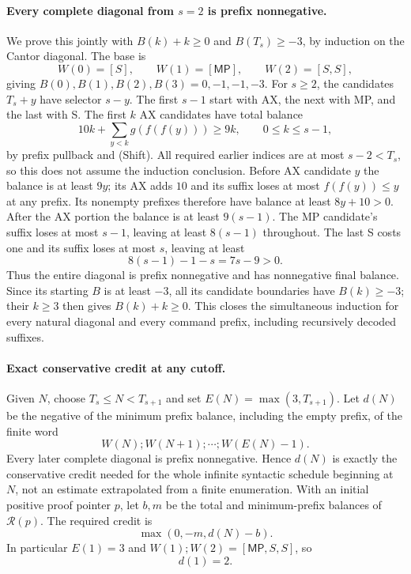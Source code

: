 \paragraph{Every complete diagonal from $s=2$ is prefix nonnegative.}
We prove this jointly with $B(k)+k\ge0$ and $B(T_s)\ge-3$, by induction
on the Cantor diagonal.  The base is
\[
 W(0)=[S],\qquad W(1)=[\mathsf{MP}],\qquad W(2)=[S,S],
\]
giving $B(0),B(1),B(2),B(3)=0,-1,-1,-3$.
For $s\ge2$, the candidates $T_s+y$ have selector $s-y$.
The first $s-1$ start with AX, the next with MP, and the last with S.
The first $k$ AX candidates have total balance
\[
 10k+\sum_{y<k}g(f(f(y)))\ge9k,\qquad 0\le k\le s-1,
\]
by prefix pullback and (Shift).  All required earlier indices are at
most $s-2<T_s$, so this does not assume the induction conclusion.
Before AX candidate $y$ the balance is at least $9y$; its AX adds $10$
and its suffix loses at most $f(f(y))\le y$ at any prefix.  Its
nonempty prefixes therefore have balance at least $8y+10>0$.
After the AX portion the balance is at least $9(s-1)$.  The MP
candidate's suffix loses at most $s-1$, leaving at least $8(s-1)$
throughout.  The last S costs one and its suffix loses at most $s$,
leaving at least
\[
                         8(s-1)-1-s=7s-9>0.
\]
Thus the entire diagonal is prefix nonnegative and has nonnegative final
balance.  Since its starting $B$ is at least $-3$, all its candidate
boundaries have $B(k)\ge-3$; their $k\ge3$ then gives $B(k)+k\ge0$.
This closes the simultaneous induction for every natural diagonal and
every command prefix, including recursively decoded suffixes.

\paragraph{Exact conservative credit at any cutoff.}
Given $N$, choose $T_s\le N<T_{s+1}$ and set
$E(N)=\max(3,T_{s+1})$.  Let $d(N)$ be the negative of the minimum
prefix balance, including the empty prefix, of the finite word
\[
                    W(N);W(N+1);\cdots;W(E(N)-1).
\]
Every later complete diagonal is prefix nonnegative.  Hence $d(N)$
is exactly the conservative credit needed for the whole infinite
syntactic schedule beginning at $N$, not an estimate extrapolated from
a finite enumeration.  With an initial positive proof pointer $p$,
let $b,m$ be the total and minimum-prefix balances of $\mathcal R(p)$.
The required credit is
\[
                         \max(0,-m,d(N)-b).
\]
In particular $E(1)=3$ and $W(1);W(2)=[\mathsf{MP},S,S]$, so
\[
                              d(1)=2.
 \tag{Credit}
\]

